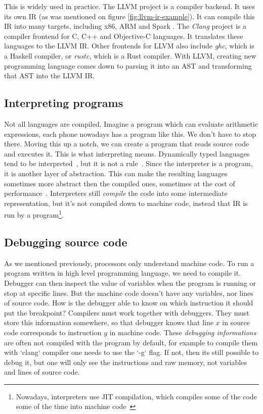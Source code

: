 This is widely used in practice. The LLVM \cite{llvm} project is a compiler backend. It uses its own IR (as was mentioned on figure \ref{fig:llvm-ir-example}).
It can compile this IR into many targets, including x86, ARM and Spark . The \textit{Clang} project is a compiler frontend for C, C++ and Objective-C languages.
It translates these languages to the LLVM IR. Other frontends for LLVM also include \textit{ghc}, which is a Haskell compiler, or \textit{rustc}, which is a Rust compiler.
With LLVM, creating new programming language comes down to parsing it into an AST and transforming that AST into the LLVM IR.

\subsection{Interpreting programs}
Not all languages are compiled. Imagine a program which can evaluate arithmetic expressions, each phone nowadays has a program like this.
We don't have to stop there. Moving this up a notch, we can create a program that reads source code and executes it.
This is what interpreting means. Dynamically typed languages tend to be interpreted~\cite{python, lua, javascript}, but it is not a rule~\cite{scala}. Since the interpreter is a program, it is another layer of abstraction. This can make
the resulting languages sometimes more abstract then the compiled ones, sometimes at the cost of performance~\cite{jit}.
Interpreters still \textit{compile} the code into some intermediate representation, but it's not compiled down to machine code, instead that IR is run by a program\footnote{Nowadays, interpreters use JIT compilation, which compiles some of the code some of the time into machine code~\cite{jit}}.

\subsection{Debugging source code}
As we mentioned previously, processors only understand machine code. To run a program written in high level programming language, we need to compile it. Debugger can then inspect the value of variables when the program is running or stop at specific lines. But the machine code doesn't have any variables, nor lines of source code. How is the debugger able to know on which instruction it should put the breakpoint? Compilers must work together with debuggers. They must store this information somewhere, so that debugger knows that line $x$ in source code corresponds to instruction $y$ in machine code. These \textit{debugging informations} are often not compiled with the program by default, for example to compile them with `clang` compiler one needs to use the `-g` flag. If not, then its still possible to debug it, but one will only see the instructions and raw memory, not variables and lines of source code.

